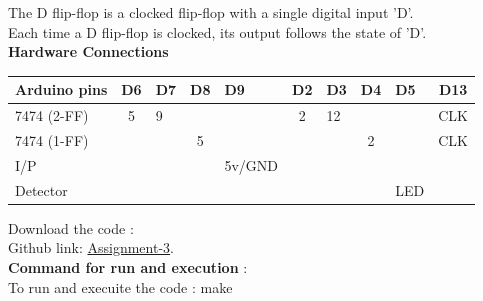\documentclass[10pt,a4paper]{report}
\begin{document}
\begin{multicols}{2}
The D flip-flop is a clocked flip-flop with a single digital input 'D'. \\ Each time a D flip-flop is clocked, its output follows the state of 'D'.\\
\vspace{1cm}
\textbf{Hardware Connections }
\begin{center}
\setlength{\arrayrulewidth}{0.5mm}
\setlength{\tabcolsep}{0.9pt}
\renewcommand{\arraystretch}{2}
    \begin{tabular}{|l|c|l|c|l|c|l|c|l|c|}
    \hline 
    \textbf{Arduino pins} & \textbf{D6} & \textbf{D7} & \textbf{D8} & \textbf{ D9} & \textbf{D2} & \textbf{D3} & \textbf{D4} & \textbf{D5}& \textbf{D13}\\
    \hline
    7474 (2-FF) & 5 & 9 &  &  & 2 & 12 &  &  & CLK \\  \hline
    7474 (1-FF) &  &  & 5 &  &  &  & 2 &  & CLK \\ \hline
    I/P &  &  &   & 5v/GND &  &  &   &    &   \\ \hline
    Detector&  &  &   &  &  &  &   & LED &  \\ 
    \hline
      \end{tabular}
  \end{center}
  
\raggedright  Download the code :\\
Github link: \href{https://github.com/chiragshah1244/FWC/blob/main/assignments/assignment_3/code/test.c}{Assignment-3}.\\ \vspace{2mm}
\textbf{Command for run and execution }:\\\vspace{1mm}
To run and execuite the code : make
  \end{multicols}
\end{document}
